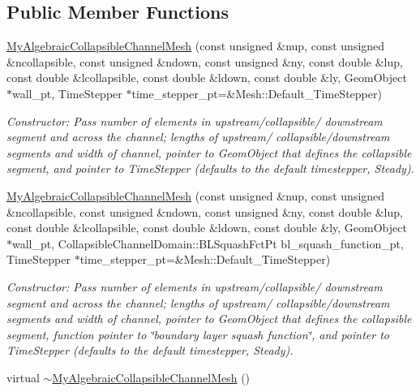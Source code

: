 \subsection*{Public Member Functions}
\begin{DoxyCompactItemize}
\item 
\hyperlink{classoomph_1_1MyAlgebraicCollapsibleChannelMesh_a1a77973034fec46c16a41d1f4d250b0a}{My\+Algebraic\+Collapsible\+Channel\+Mesh} (const unsigned \&nup, const unsigned \&ncollapsible, const unsigned \&ndown, const unsigned \&ny, const double \&lup, const double \&lcollapsible, const double \&ldown, const double \&ly, Geom\+Object $\ast$wall\+\_\+pt, Time\+Stepper $\ast$time\+\_\+stepper\+\_\+pt=\&Mesh\+::\+Default\+\_\+\+Time\+Stepper)
\begin{DoxyCompactList}\small\item\em Constructor\+: Pass number of elements in upstream/collapsible/ downstream segment and across the channel; lengths of upstream/ collapsible/downstream segments and width of channel, pointer to Geom\+Object that defines the collapsible segment, and pointer to Time\+Stepper (defaults to the default timestepper, Steady). \end{DoxyCompactList}\item 
\hyperlink{classoomph_1_1MyAlgebraicCollapsibleChannelMesh_a36eed7b6be90d44726091c6d97d53e3f}{My\+Algebraic\+Collapsible\+Channel\+Mesh} (const unsigned \&nup, const unsigned \&ncollapsible, const unsigned \&ndown, const unsigned \&ny, const double \&lup, const double \&lcollapsible, const double \&ldown, const double \&ly, Geom\+Object $\ast$wall\+\_\+pt, Collapsible\+Channel\+Domain\+::\+B\+L\+Squash\+Fct\+Pt bl\+\_\+squash\+\_\+function\+\_\+pt, Time\+Stepper $\ast$time\+\_\+stepper\+\_\+pt=\&Mesh\+::\+Default\+\_\+\+Time\+Stepper)
\begin{DoxyCompactList}\small\item\em Constructor\+: Pass number of elements in upstream/collapsible/ downstream segment and across the channel; lengths of upstream/ collapsible/downstream segments and width of channel, pointer to Geom\+Object that defines the collapsible segment, function pointer to \char`\"{}boundary layer squash function\char`\"{}, and pointer to Time\+Stepper (defaults to the default timestepper, Steady). \end{DoxyCompactList}\item 
virtual \hyperlink{classoomph_1_1MyAlgebraicCollapsibleChannelMesh_aba200b3263e6a11eb26739965df8cbcc}{$\sim$\+My\+Algebraic\+Collapsible\+Channel\+Mesh} ()

\end{DoxyCompactItemize}
